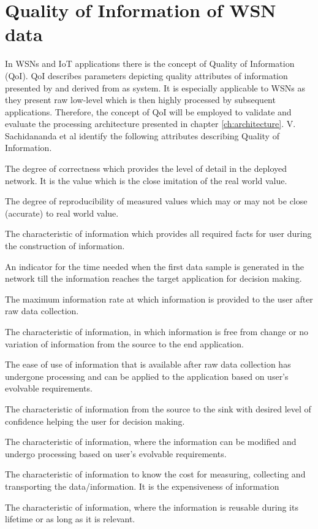 \section{Quality of Information of WSN data}
\label{sec:back:qoi}
In WSNs and IoT applications there is the concept of Quality of Information (QoI). QoI describes parameters depicting quality attributes of information presented by and derived from as system. It is especially applicable to WSNs as they present raw low-level which is then highly processed by subsequent applications. Therefore, the concept of QoI will be employed to validate and evaluate the processing architecture presented in chapter \ref{ch:architecture}. V. Sachidananda et al \cite{qoi_definition} identify the following attributes describing Quality of Information.
\begin{description}
\nospace
\item[Accuracy] The degree of correctness which provides the level of detail in the deployed network. It is the value which is the close imitation of the real world value.
\item[Precision] The degree of reproducibility of measured values which may or may not be close (accurate) to real world value.
\item[Completeness] The characteristic of information which provides all required facts for user during the construction of information.
\item[Timeliness] An indicator for the time needed when the first data sample is generated in the network till the information reaches the target application for decision making.
\item[Throughput] The maximum information rate at which information is provided to the user after raw data collection.
\item[Reliability] The characteristic of information, in which information is free from change or no variation of information from the source to the end application.
\item[Usability] The ease of use of information that is available after raw data collection has undergone processing and can be applied to the application based on user's evolvable requirements.
\item[Certainty] The characteristic of information from the source to the sink with desired level of confidence helping the user for decision making.
\item[Tunability] The characteristic of information, where the information can be modified and undergo processing based on user's evolvable requirements.
\item[Affordability] The characteristic of information to know the cost for measuring, collecting and transporting the data/information. It is the expensiveness of information
\item[Reusability] The characteristic of information, where the information is reusable during its lifetime or as long as it is relevant.
\end{description}
